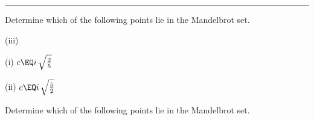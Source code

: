 \documentclass[english,a4paper,11pt]{scrartcl}
\begin{document}
\comment{===========================================================}
\noindent\rule[0.5ex]{\linewidth}{1pt} 
\newpage
\begin{Question}{}

 Determine which of the following points lie in the Mandelbrot set.\\

\begin{labeling}{(iii) }
\item [(i)]  \quad \( c \EQ i \, \sqrt{\frac{2}{5}}  \)

\bigskip
\item [(ii)] \quad \( c \EQ i \, \sqrt{\frac{5}{2}}  \)
  
\end{labeling}

\bigskip
\end{Question}

\setcounter{equation}{0}

\bigskip

 Determine which of the following points lie in the Mandelbrot set.\\
\end{document}
